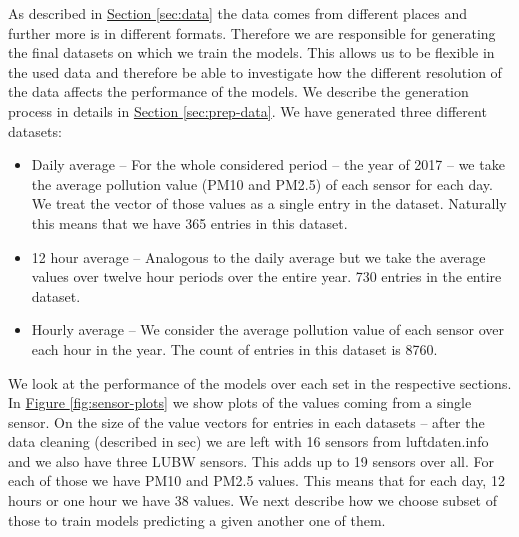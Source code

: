 \documentclass[12pt,a4paper,twoside]{scrartcl}
\numberwithin{equation}{section}
\newcommand{\reffig}[1]{\hyperref[#1]{Figure \ref*{#1}}}
\newcommand{\refsec}[1]{\hyperref[#1]{Section \ref*{#1}}}
\begin{document}
As described in \refsec{sec:data} the data comes from different places and further more is in different formats. Therefore we are responsible for generating the final datasets on which we train the models. This allows us to be flexible in the used data and therefore be able to investigate how the different resolution of the data affects the performance of the models. We describe the generation process in details in \refsec{sec:prep-data}. We have generated three different datasets:
\begin{itemize}
\item Daily average -- For the whole considered period -- the year of 2017 -- we take the average pollution value (PM10 and PM2.5) of each sensor for each day. We treat the vector of those values as a single entry in the dataset. Naturally this means that we have 365 entries in this dataset.
\item 12 hour average -- Analogous to the daily average but we take the average values over twelve hour periods over the entire year. 730 entries in the entire dataset.
\item Hourly average -- We consider the average pollution value of each sensor over each hour in the year. The count of entries in this dataset is 8760.
\end{itemize}
We look at the performance of the models over each set in the respective sections. In \reffig{fig:sensor-plots} we show plots of the values coming from a single sensor. On the size of the value vectors for entries in each datasets -- after the data cleaning (described in sec) we are left with 16 sensors from luftdaten.info and we also have three LUBW sensors. This adds up to 19 sensors over all. For each of those we have PM10 and PM2.5 values. This means that for each day, 12 hours or one hour we have 38 values. We next describe how we choose subset of those to train models predicting a given another one of them.
\end{document}
